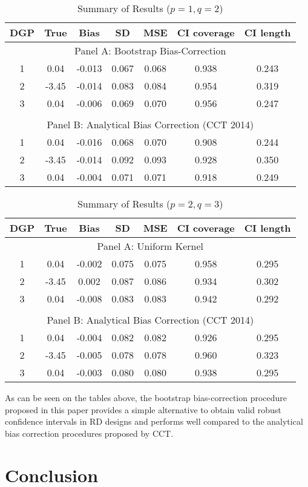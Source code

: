 \documentclass[12pt,fleqn]{article}
\begin{document}
\begin{table}[ht] \label{Tb1}
	\caption{Summary of Results ($p = 1, q = 2$)}
	\centering
	\begin{tabular}{ccccccc}
		\hline
		DGP & True & Bias & SD & MSE & CI coverage & CI length \\ 
		\hline
		\multicolumn{7}{c}{Panel A: Bootstrap Bias-Correction} \\
		1 & 0.04 & -0.013 & 0.067 & 0.068 & 0.938 & 0.243 \\ 
		2 & -3.45 & -0.014 & 0.083 & 0.084 & 0.954 & 0.319 \\ 
		3 & 0.04 & -0.006 & 0.069 & 0.070 & 0.956 & 0.247 \\ 
		&&&&&& \\
		\multicolumn{7}{c}{Panel B: Analytical Bias Correction (CCT 2014)} \\
		1 & 0.04 & -0.016 & 0.068 & 0.070 & 0.908 & 0.244 \\ 
		2 & -3.45 & -0.014 & 0.092 & 0.093 & 0.928 & 0.350 \\ 
		3 & 0.04 & -0.004 & 0.071 & 0.071 & 0.918 & 0.249 \\ 
		\hline
	\end{tabular}
\end{table}

\begin{table}[ht]\label{Tb2}
	\caption{Summary of Results ($p = 2, q = 3$)}
	\centering
	\begin{tabular}{ccccccc}
		\hline
		DGP & True & Bias & SD & MSE & CI coverage & CI length \\ 
		\hline
		\multicolumn{7}{c}{Panel A: Uniform Kernel} \\
		1 & 0.04 & -0.002 & 0.075 & 0.075 & 0.958 & 0.295 \\ 
		2 & -3.45 & 0.002 & 0.087 & 0.086 & 0.934 & 0.302 \\ 
		3 & 0.04 & -0.008 & 0.083 & 0.083 & 0.942 & 0.292 \\ 
		&&&&&& \\
		\multicolumn{7}{c}{Panel B: Analytical Bias Correction (CCT 2014)} \\
		1 & 0.04 & -0.004 & 0.082 & 0.082 & 0.926 & 0.295 \\ 		
		2 & -3.45 & -0.005 & 0.078 & 0.078 & 0.960 & 0.323 \\ 		
		3 & 0.04 & -0.003 & 0.080 & 0.080 & 0.938 & 0.295 \\ 
		\hline
	\end{tabular}
\end{table}

As can be seen on the tables above, the bootstrap bias-correction procedure
proposed in this paper provides a simple alternative to obtain valid robust
confidence intervals in RD designs and performs well compared to the analytical 
bias correction procedures proposed by CCT.

\section{Conclusion}\label{conclusion}

\clearpage


\end{document}
